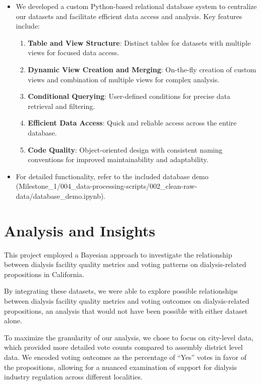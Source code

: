 \documentclass[
  11pt,
  letterpaper,
  DIV=11,
  numbers=noendperiod]{scrartcl}
\providecommand{\tightlist}{%
  \setlength{\itemsep}{0pt}\setlength{\parskip}{0pt}}\usepackage{longtable,booktabs,array}
\begin{document}
\begin{itemize}
\item
  We developed a custom Python-based relational database system to
  centralize our datasets and facilitate efficient data access and
  analysis. Key features include:

  \begin{enumerate}
  \def\labelenumi{\arabic{enumi}.}
  \tightlist
  \item
    \textbf{Table and View Structure}: Distinct tables for datasets with
    multiple views for focused data access.
  \item
    \textbf{Dynamic View Creation and Merging}: On-the-fly creation of
    custom views and combination of multiple views for complex analysis.
  \item
    \textbf{Conditional Querying}: User-defined conditions for precise
    data retrieval and filtering.
  \item
    \textbf{Efficient Data Access}: Quick and reliable access across the
    entire database.
  \item
    \textbf{Code Quality}: Object-oriented design with consistent naming
    conventions for improved maintainability and adaptability.
  \end{enumerate}
\item
  For detailed functionality, refer to the included database demo
  (Milestone\_1/004\_data-processing-scripts/002\_clean-raw-data/database\_demo.ipynb).
\end{itemize}

\section{Analysis and Insights}\label{analysis-and-insights}

This project employed a Bayesian approach to investigate the
relationship between dialysis facility quality metrics and voting
patterns on dialysis-related propositions in California.

By integrating these datasets, we were able to explore possible
relationships between dialysis facility quality metrics and voting
outcomes on dialysis-related propositions, an analysis that would not
have been possible with either dataset alone.

To maximize the granularity of our analysis, we chose to focus on
city-level data, which provided more detailed vote counts compared to
assembly district level data. We encoded voting outcomes as the
percentage of ``Yes'' votes in favor of the propositions, allowing for a
nuanced examination of support for dialysis industry regulation across
different localities.
\end{document}
